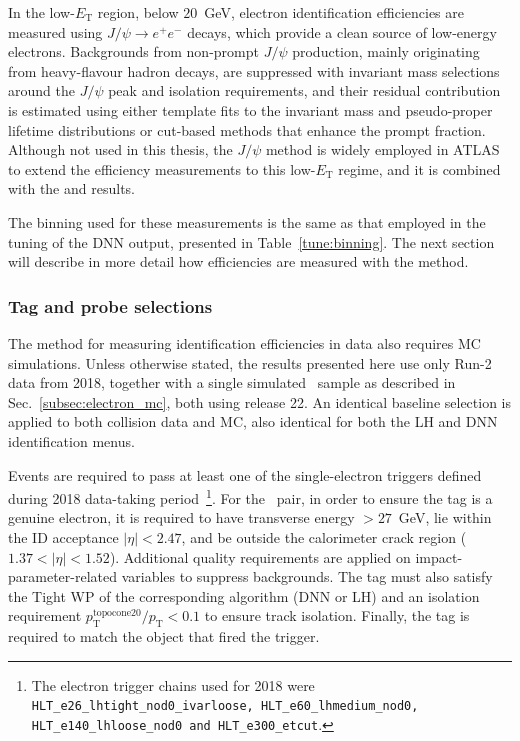 In the low-$E_{\mathrm{T}}$ region, below $20$~GeV, electron identification efficiencies are measured using $J/\psi \to e^+e^-$ decays, which provide a clean source of low-energy electrons. Backgrounds from non-prompt $J/\psi$ production, mainly originating from heavy-flavour hadron decays, are suppressed with invariant mass selections around the $J/\psi$ peak and isolation requirements, and their residual contribution is estimated using either template fits to the invariant mass and pseudo-proper lifetime distributions or cut-based methods that enhance the prompt fraction. Although not used in this thesis, the $J/\psi$ method is widely employed in ATLAS to extend the efficiency measurements to this low-$E_{\mathrm{T}}$ regime, and it is combined with the \zmass and \ziso results.

The binning used for these measurements is the same as that employed in the tuning of the DNN output, presented in Table~\ref{tune:binning}. The next section will describe in more detail how efficiencies are measured with the \zmass method.

\subsubsection{Tag and probe selections}

The \zmass method for measuring identification efficiencies in data also requires MC simulations. Unless otherwise stated, the results presented here use only Run-2 data from 2018, together with a single simulated \zee\ sample as described in Sec.~\ref{subsec:electron_mc}, both using release 22. An identical baseline selection is applied to both collision data and MC, also identical for both the LH and DNN identification menus.

Events are required to pass at least one of the single-electron triggers defined during 2018 data-taking period~\footnote{The electron trigger chains used for 2018 were \texttt{HLT\_e26\_lhtight\_nod0\_ivarloose, HLT\_e60\_lhmedium\_nod0, HLT\_e140\_lhloose\_nod0 and HLT\_e300\_etcut}.}. For the \tp\ pair, 
in order to ensure the tag is a genuine electron, it is required to have transverse energy \et$>27$~GeV, lie within the ID acceptance $|\eta|<2.47$, and be outside the calorimeter crack region ($1.37<|\eta|<1.52$). 
Additional quality requirements are applied on impact-parameter-related variables to suppress backgrounds.
The tag must also satisfy the Tight WP of the corresponding algorithm (DNN or LH) and an isolation requirement $p_{\mathrm{T}}^{\mathrm{topocone20}}/p_{\mathrm{T}}<0.1$ to ensure track isolation. 
Finally, the tag is required to match the object that fired the trigger.

